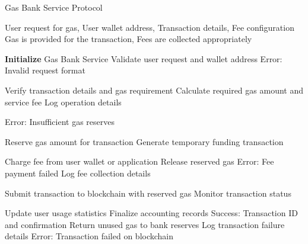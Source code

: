 
\begin{algorithm}
\caption{Gas Bank Service Protocol}
\label{alg:gas-bank}
\begin{algorithmic}[1]
\Require User request for gas, User wallet address, Transaction details, Fee configuration
\Ensure Gas is provided for the transaction, Fees are collected appropriately

\State \textbf{Initialize} Gas Bank Service
\State Validate user request and wallet address
    \State \Return Error: Invalid request format
\EndIf

\State Verify transaction details and gas requirement
\State Calculate required gas amount and service fee
\State Log operation details

    \State \Return Error: Insufficient gas reserves
\EndIf

\State Reserve gas amount for transaction
\State Generate temporary funding transaction

    \State Charge fee from user wallet or application
        \State Release reserved gas
        \State \Return Error: Fee payment failed
    \EndIf
    \State Log fee collection details
\EndIf

\State Submit transaction to blockchain with reserved gas
\State Monitor transaction status

    \State Update user usage statistics
    \State Finalize accounting records
    \State \Return Success: Transaction ID and confirmation
\Else
    \State Return unused gas to bank reserves
    \State Log transaction failure details
    \State \Return Error: Transaction failed on blockchain
\EndIf

\end{algorithmic}
\end{algorithm} 